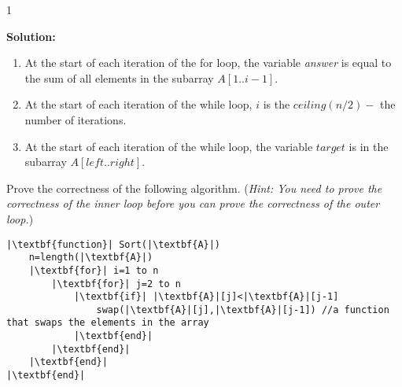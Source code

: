 \documentclass[9pt]{article}
\def\solutions{1}
\begin{document}
\if\solutions1
\vspace{2mm}

\textbf{Solution:} \\

\begin{enumerate}
    \item At the start of each iteration of the for loop, the variable \textit{answer} is equal to the sum of all elements in the subarray $A[1 .. i-1]$.
    \item At the start of each iteration of the while loop, $i$ is the $ceiling (n/2) - $ the number of iterations.
    \item At the start of each iteration of the while loop, the variable $target$ is in the subarray $A[left..right]$.
\end{enumerate}

\fi
\newpage



\vspace{5mm}

\item 
Prove the correctness of the following algorithm. (\textit{Hint: You need to prove the correctness of the inner loop before you can prove the correctness of the outer loop.})

\begin{small}
\begin{lstlisting}
|\textbf{function}| Sort(|\textbf{A}|)
    n=length(|\textbf{A}|) 
    |\textbf{for}| i=1 to n
        |\textbf{for}| j=2 to n
            |\textbf{if}| |\textbf{A}|[j]<|\textbf{A}|[j-1]
                swap(|\textbf{A}|[j],|\textbf{A}|[j-1]) //a function that swaps the elements in the array
            |\textbf{end}|
        |\textbf{end}|
    |\textbf{end}|
|\textbf{end}|
\end{lstlisting}
\end{small}
\end{document}
